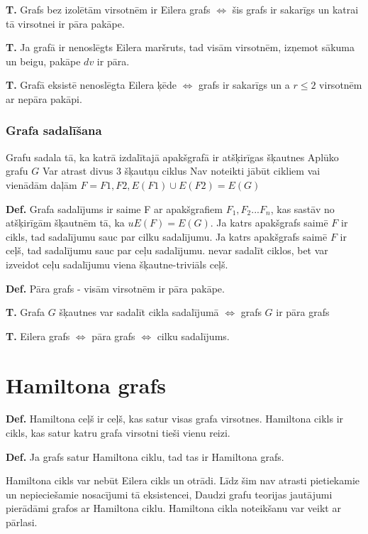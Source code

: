 \documentclass{article}
\begin{document}
\textbf{T. } Grafs bez izolētām virsotnēm ir Eilera grafs $\Leftrightarrow $ šis grafs ir sakarīgs un katrai tā virsotnei ir pāra pakāpe.

\textbf{T. } Ja grafā ir nenoslēgts Eilera maršruts, tad visām virsotnēm, izņemot sākuma un beigu, pakāpe $dv$ ir pāra.

\textbf{T. } Grafā eksistē nenoslēgta Eilera ķēde $⇔$ grafs ir sakarīgs un a $r \le 2$ virsotnēm ar nepāra pakāpi.

\subsubsection{Grafa sadalīšana}

Grafu sadala tā, ka katrā izdalītajā apakšgrafā ir atšķirīgas šķautnes Aplūko grafu $ G $ Var atrast divus 3 šķautņu ciklus Nav noteikti jābūt cikliem vai vienādām daļām $F = F1 , F2 , E (F1 ) \cup E (F2 ) = E (G )$

\textbf{Def.}  Grafa sadalījums ir saime F ar apakšgrafiem $F_1 , F_2 ...F_n$, kas sastāv no atšķirīgām šķautnēm tā, ka $uE (F ) = E (G )$.  Ja katrs apakšgrafs saimē $F$ ir cikls, tad sadalījumu sauc par cilku sadalījumu. Ja katrs apakšgrafs saimē $F$ ir ceļš, tad sadalījumu sauc par ceļu sadalījumu.  nevar sadalīt ciklos, bet var izveidot ceļu sadalījumu viena šķautne-triviāls ceļš.

\textbf{Def.}  Pāra grafs - visām virsotnēm ir pāra pakāpe. 

\textbf{T. } Grafa $G$ šķautnes var sadalīt cikla sadalījumā $\Leftrightarrow$ grafs $G$ ir pāra grafs

\textbf{T. } Eilera grafs $\Leftrightarrow$ pāra grafs $\Leftrightarrow$ cilku sadalījums.

\section{Hamiltona grafs}

\textbf{Def.}  Hamiltona ceļš ir ceļš, kas satur visas grafa virsotnes.  Hamiltona cikls ir cikls, kas satur katru grafa virsotni tieši vienu reizi.

\textbf{Def.}  Ja grafs satur Hamiltona ciklu, tad tas ir Hamiltona grafs.

Hamiltona cikls var nebūt Eilera cikls un otrādi.  Līdz šim nav atrasti pietiekamie un nepieciešamie nosacījumi tā eksistencei, Daudzi grafu teorijas jautājumi pierādāmi grafos ar Hamiltona ciklu. Hamiltona cikla noteikšanu var veikt ar pārlasi.
\end{document}
